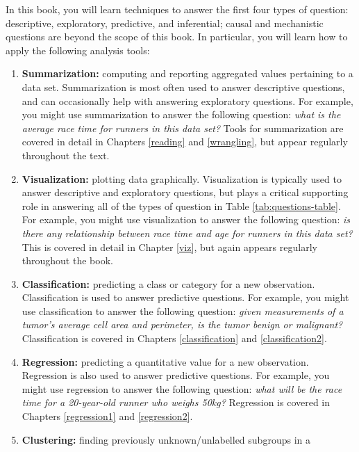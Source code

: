 \documentclass[
  12pt,
]{krantz}
\providecommand{\tightlist}{%
  \setlength{\itemsep}{0pt}\setlength{\parskip}{0pt}}
\begin{document}
In this book, you will learn techniques to answer the
first four types of question: descriptive, exploratory, predictive, and inferential;
causal and mechanistic questions are beyond the scope of this book.
In particular, you will learn how to apply the following analysis tools:

\begin{enumerate}
\def\labelenumi{\arabic{enumi}.}
\tightlist
\item
  \textbf{Summarization:}  computing and reporting aggregated values pertaining to a data set.
  Summarization is most often used to answer descriptive questions,
  and can occasionally help with answering exploratory questions.
  For example, you might use summarization to answer the following question:
  \emph{what is the average race time for runners in this data set?}
  Tools for summarization are covered in detail in Chapters \ref{reading}
  and \ref{wrangling}, but appear regularly throughout the text.
\item
  \textbf{Visualization:}  plotting data graphically.
  Visualization is typically used to answer descriptive and exploratory questions,
  but plays a critical supporting role in answering all of the types of question in Table \ref{tab:questions-table}.
  For example, you might use visualization to answer the following question:
  \emph{is there any relationship between race time and age for runners in this data set?}
  This is covered in detail in Chapter \ref{viz}, but again appears regularly throughout the book.
\item
  \textbf{Classification:}  predicting a class or category for a new observation.
  Classification is used to answer predictive questions.
  For example, you might use classification to answer the following question:
  \emph{given measurements of a tumor's average cell area and perimeter, is the tumor benign or malignant?}
  Classification is covered in Chapters \ref{classification} and \ref{classification2}.
\item
  \textbf{Regression:}  predicting a quantitative value for a new observation.
  Regression is also used to answer predictive questions.
  For example, you might use regression to answer the following question:
  \emph{what will be the race time for a 20-year-old runner who weighs 50kg?}
  Regression is covered in Chapters \ref{regression1} and \ref{regression2}.
\item
  \textbf{Clustering:}  finding previously unknown/unlabelled subgroups in a

\end{enumerate}
\end{document}
